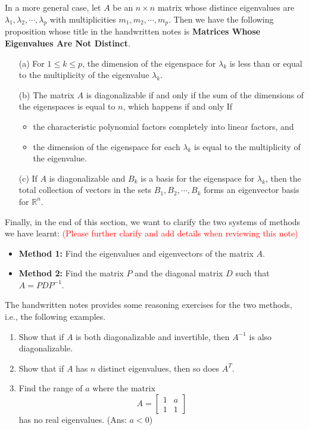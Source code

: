 \documentclass[10pt, a4paper]{article}
\newcommand{\R}{\mathbb{R}}
\begin{document}
In a more general case, let $A$ be an $n\times n$ matrix whose distince eigenvalues are $\lambda_1,\lambda_2,\cdots,\lambda_p$ with multiplicities $m_1,m_2,\cdots,m_p$. Then we have the following proposition whose title in the handwritten notes is \textbf{Matrices Whose Eigenvalues Are Not Distinct}.
\begin{itemize}
    \item[(a)] For $1\leq k\leq p$, the dimension of the eigenspace for $\lambda_k$ is less than or equal to the multiplicity of the eigenvalue $\lambda_k$.
    \item[(b)] The matrix $A$ is diagonalizable if and only if the sum of the dimensions of the eigenspaces is equal to $n$, which happens if and only If
    \begin{itemize}
        \item the characteristic polynomial factors completely into linear factors, and
        \item the dimension of the eigenspace for each $\lambda_k$ is equal to the multiplicity of the eigenvalue.
    \end{itemize}
    \item[(c)] If $A$ is diagonalizable and $B_k$ is a basis for the eigenspace for $\lambda_k$, then the total collection of vectors in the sets $B_1,B_2,\cdots,B_k$ forms an eigenvector basis for $\R^n$.
\end{itemize}
\indent Finally, in the end of this section, we want to clarify the two systems of methods we have learnt: \textcolor{Red}{(Please further clarify and add details when reviewing this note)}
\begin{itemize}
    \item \textbf{Method 1:} Find the eigenvalues and eigenvectors of the matrix $A$.
    \item \textbf{Method 2:} Find the matrix $P$ and the diagonal matrix $D$ such that $A=PDP^{-1}$.
\end{itemize}
\indent The handwritten notes provides some reasoning exercises for the two methods, i.e., the following examples.
\begin{example}
    \begin{enumerate}
        \item Show that if $A$ is both diagonalizable and invertible, then $A^{-1}$ is also diagonalizable.
        \item Show that if $A$ has $n$ distinct eigenvalues, then so does $A^T$.
        \item Find the range of $a$ where the matrix \[
        A = \begin{bmatrix}
            1&a\\
            1&1
        \end{bmatrix}
        \]
        has no real eigenvalues. (Ans: $a<0$)
    \end{enumerate}
\end{example}
\end{document}
